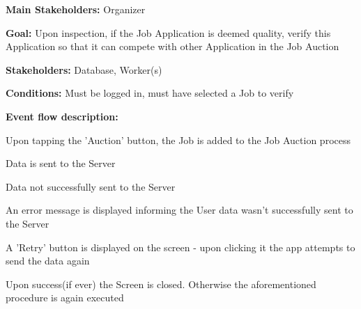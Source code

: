 			\noindent {}
			\begin{packed_item}
				\item \textbf{Main Stakeholders:} Organizer
				\item \textbf{Goal:} Upon inspection, if the Job Application is deemed quality, verify this Application so that it can compete with other Application in the Job Auction
				\item \textbf{Stakeholders: } Database, Worker(s)
				\item \textbf{Conditions: } Must be logged in, must have selected a Job to verify
				\item \textbf{Event flow description: }
				\begin{packed_enum}
					\item Upon tapping the 'Auction' button, the Job is added to the Job Auction process
					\item Data is sent to the Server
				\end{packed_enum}
				
				\begin{packed_item}
					\item[1.a] Data not successfully sent to the Server
					\item[] \begin{packed_enum}
						\item An error message is displayed informing the User data wasn't successfully sent to the Server
						\item A 'Retry' button is displayed on the screen - upon clicking it the app attempts to send the data again
						\item Upon success(if ever) the Screen is closed. Otherwise the aforementioned procedure is again executed
					\end{packed_enum}
				\end{packed_item}
			\end{packed_item}
		
